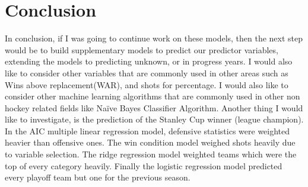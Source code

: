 \chapter{Conclusion}
In conclusion, if I was going to continue work on these models, then the next step would be to build supplementary models to predict our predictor variables, extending the models to predicting unknown, or in progress years. I would also like to consider other variables that are commonly used in other areas such as Wins above replacement(WAR), and shots for percentage. I would also like to consider other machine learning algorithms that are commonly used in other non hockey related fields like Naïve Bayes Classifier Algorithm\cite{ML}. Another thing I would like to investigate, is the prediction of the Stanley Cup winner (league champion). In the AIC multiple linear regression model, defensive statistics were weighted heavier than offensive ones. The win condition model weighed shots heavily due to variable selection. The ridge regression model weighted teams which were the top of every category heavily. Finally the logistic regression model predicted every playoff team but one for the previous season.     